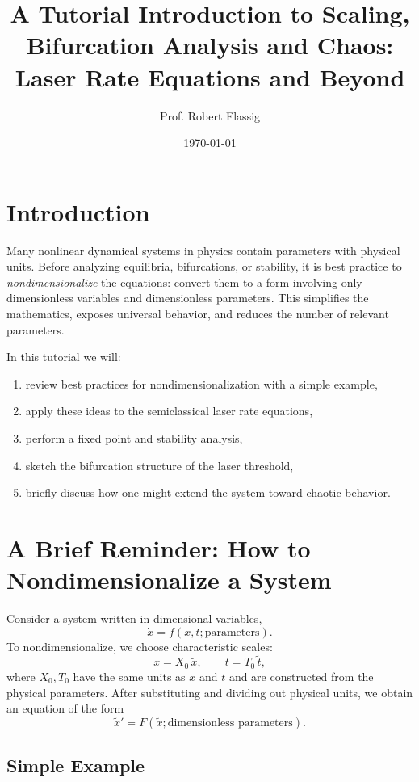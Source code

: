 \documentclass[11pt]{amsart}
\title{A Tutorial Introduction to Scaling, Bifurcation Analysis and Chaos:\\
Laser Rate Equations and Beyond}
\author{Prof. Robert Flassig}
\date{\today}
\begin{document}
\maketitle
\tableofcontents
\section{Introduction}

Many nonlinear dynamical systems in physics contain parameters with physical
units.  Before analyzing equilibria, bifurcations, or stability, it is best
practice to \emph{nondimensionalize} the equations: convert them to a form
involving only dimensionless variables and dimensionless parameters.  
This simplifies the mathematics, exposes universal behavior, and reduces the
number of relevant parameters.

In this tutorial we will:

\begin{enumerate}
    \item review best practices for nondimensionalization with a simple example,
    \item apply these ideas to the semiclassical laser rate equations,
    \item perform a fixed point and stability analysis,
    \item sketch the bifurcation structure of the laser threshold,
    \item briefly discuss how one might extend the system toward chaotic behavior.
\end{enumerate}

\vspace{1em}
\section{A Brief Reminder: How to Nondimensionalize a System}

Consider a system written in dimensional variables,
\[
\dot x = f(x,t; \text{parameters}).
\]
To nondimensionalize, we choose characteristic scales:
\[
x = X_0 \,\tilde x, \qquad t = T_0 \,\tilde t,
\]
where $X_0, T_0$ have the same units as $x$ and $t$ and are constructed from the
physical parameters.  After substituting and dividing out physical units, we
obtain an equation of the form
\[
\tilde x' = F(\tilde x; \text{dimensionless parameters}).
\]

\subsection{Simple Example}
\end{document}
